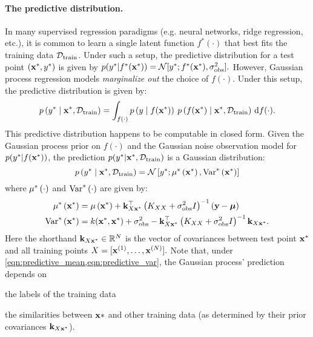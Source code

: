 \paragraph{The predictive distribution.}
In many supervised regression paradigms (e.g. neural networks, ridge regression, etc.), it is common to learn a single latent function $f^*(\cdot)$ that best fits the training data $\mathcal D_\text{train}$.
Under such a setup, the predictive distribution for a test point $(\mathbf{x}^*, y^*)$ is given by
$ p(\ytest \vert f^*(\bxtest)) = \normaldist{ \ytest; f^*(\bxtest) }{ \sigma^2_\text{obs} }. $
However, Gaussian process regression models \emph{marginalize out} the choice of $f(\cdot)$.
Under this setup, the predictive distribution is given by:
\begin{equation*}
  p \left( y^* \mid \mathbf{x}^*, \mathcal D_\text{train} \right)
  = \int_{f(\cdot)} p\left( y \mid f(\mathbf{x}^*) \right) \: p\left( f(\mathbf{x}^*) \mid \mathbf{x}^*, \mathcal D_\text{train} \right)
  \,\mathrm{d}{f}(\cdot).
\end{equation*}
%
This predictive distribution happens to be computable in closed form.
Given the Gaussian process prior on $f(\cdot)$ and the Gaussian noise observation model for $p(y^* \vert f(\mathbf{x}^*))$, the prediction $p(y^* \vert \mathbf{x}^*, \mathcal D_\text{train})$ is a Gaussian distribution:
%
\begin{equation}
  p \left(
    \ytest \mid \bxtest, \dset_\text{train}
  \right)
  = \normaldist{ \ytest ; \meantest{\bxtest}}{ \vartest{\bxtest} }
  \label{eqn:predictive}
\end{equation}
%
where $\mu^* \left( \cdot \right)$ and $\text{Var}^* \left( \cdot \right)$ are given by:
%
\begin{align}
  \mu^* \left( \mathbf{x}^* \right)
  &= \mu\left( \mathbf{x}^* \right) + \mathbf{k}_{X \mathbf{x}^*}^\top \left( K_{XX} + \sigma_\text{obs}^2 I \right)^{-1} \left( \mathbf{y} - \boldsymbol{\mu} \right)
  \label{eqn:predictive_mean}
  \\
  \text{Var}^* \left( \mathbf{x}^* \right)
  &= k ( \mathbf{x}^*, \mathbf{x}^*) + \sigma^2_\text{obs} - \mathbf{k}_{X \mathbf{x}^*}^\top \left( K_{XX} + \sigma_\text{obs}^2 I \right)^{-1} \mathbf{k}_{X \mathbf{x}^*}.
  \label{eqn:predictive_var}
\end{align}
%
Here the shorthand $\mathbf{k}_{X \mathbf{x}^*} \in \mathbb{R}^N$ is the vector of covariances between test point $\mathbf{x}^*$ and all training points $X = [\mathbf{x}^{(1)}, \ldots, \mathbf{x}^{(N)}].$
Note that, under \cref{eqn:predictive_mean,eqn:predictive_var}, the Gaussian process' prediction depends on
\begin{enumerate*}
  \item the labels of the training data
  \item the similarities between $\mathbf{x}*$ and other training data (as determined by their prior covariances $\mathbf{k}_{X \mathbf{x}^*}$).
\end{enumerate*}

